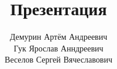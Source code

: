 \documentclass[12pt]{beamer}
\title{Презентация}
\author{Демурин Артём Андреевич \\ Гук Ярослав Анндреевич  \\ Веселов Сергей Вячеславович}
\institute[МИСИС]{Институт Новых Материалов}
\date[?/?/?]
\begin{document}
\frame{\titlepage}
\end{document}
